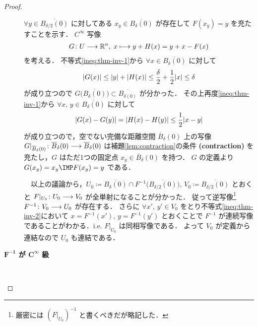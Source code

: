 \documentclass[TQFT_main]{subfiles}
\begin{document}
\begin{proof}
\begin{description}
        $\forall y \in \overline{B_{\delta/2}(0)}$ に対してある $x_y \in \overline{B_\delta(0)}$ が存在して $F(x_y) = y$ を充たすことを示す．
        $C^\infty$ 写像
        \begin{align}
            G \colon U \longrightarrow \mathbb{R}^n,\; x \longmapsto y + H(x) = y + x - F(x)
        \end{align}
        を考える．
        不等式\eqref{ineq:thm-inv-1}から $\forall x \in \overline{B_\delta(0)}$ に対して
        \begin{align}
            \abs{G(x)} \le \abs{y} + \abs{H(x)} \le \frac{\delta}{2} + \frac{1}{2}\abs{x} \le \delta
        \end{align}
        が成り立つので $G \bigl( \overline{B_\delta(0)} \bigr) \subset \overline{B_{\delta(0)}}$ が分かった．
        その上再度\eqref{ineq:thm-inv-1}から $\forall x,\, y \in \overline{B_\delta(0)}$ に対して
        \begin{align}
            \abs{G(x) - G(y)} = \abs{H(x) - H(y)} \le \frac{1}{2} \abs{x - y}
        \end{align}
        が成り立つので，空でない完備な距離空間 $\overline{B}_\delta(0)$ 上の写像 $G|_{\overline{B}_\delta(0)} \colon \overline{B}_\delta(0) \longrightarrow \overline{B}_\delta(0)$ は補題\ref{lem:contraction}の条件 \textsf{\textbf{(contraction)}} を充たし，$G$ はただ1つの固定点 $x_y \in \overline{B}_\delta(0)$ を持つ．
        $G$ の定義より $G(x_y) = x_y \IMP F(x_y) = y$ である．

        　以上の議論から，$U_0 \coloneqq \overline{B_\delta(0)} \cap F^{-1}\bigl( \overline{B_{\delta/2}(0)} \bigr),\, V_0 \coloneqq \overline{B_{\delta/2}(0)}$ とおくと $F|_{U_0} \colon U_0 \longrightarrow V_0$ が全単射になることが分かった．
        従って逆写像\footnote{厳密には $(F|_{U_0})^{-1}$ と書くべきだが略記した．} $F^{-1} \colon V_0 \longrightarrow U_0$ が存在する．
        さらに $\forall x',\, y' \in V_0$ をとり不等式\eqref{ineq:thm-inv-2}において $x = F^{-1}(x'),\, y = F^{-1}(y')$ とおくことで $F^{-1}$ が連続写像であることがわかる．i.e. $F|_{U_0}$ は同相写像である．
        よって $V_0$ が定義から連結なので $U_0$ も連結である．

        \item[\textbf{$\bm{F^{-1}}$ が $\bm{C^\infty}$ 級}]　
        

\end{description}
\end{proof}
\end{document}

